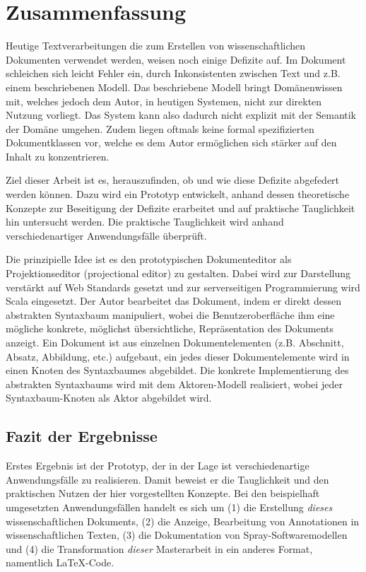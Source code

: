  
\chapter{Zusammenfassung}\label{}
 
Heutige Textverarbeitungen die zum Erstellen von wissenschaftlichen Dokumenten verwendet werden, weisen noch einige Defizite auf. Im Dokument schleichen sich leicht Fehler ein, durch Inkonsistenten zwischen Text und z.B. einem beschriebenen Modell. Das beschriebene Modell bringt Domänenwissen mit, welches jedoch dem Autor, in heutigen Systemen, nicht zur direkten Nutzung vorliegt. Das System kann also dadurch nicht explizit mit der Semantik der Domäne umgehen. Zudem liegen oftmals keine formal spezifizierten Dokumentklassen vor, welche es dem Autor ermöglichen sich stärker auf den Inhalt zu konzentrieren.

 
Ziel dieser Arbeit ist es, herauszufinden, ob und wie diese Defizite abgefedert werden können. Dazu wird ein Prototyp entwickelt, anhand dessen theoretische Konzepte zur Beseitigung der Defizite erarbeitet und auf praktische Tauglichkeit hin untersucht werden. Die praktische Tauglichkeit wird anhand verschiedenartiger Anwendungsfälle überprüft.

 
Die prinzipielle Idee ist es den prototypischen Dokumenteditor als Projektionseditor (projectional editor) zu gestalten. Dabei wird zur Darstellung verstärkt auf Web Standards gesetzt und zur serverseitigen Programmierung wird Scala eingesetzt. Der Autor bearbeitet das Dokument, indem er direkt dessen abstrakten Syntaxbaum manipuliert, wobei die Benutzeroberfläche ihm eine mögliche konkrete, möglichst übersichtliche, Repräsentation des Dokuments anzeigt. Ein Dokument ist aus einzelnen Dokumentelementen (z.B. Abschnitt, Absatz, Abbildung, etc.) aufgebaut, ein jedes dieser Dokumentelemente wird in einen Knoten des Syntaxbaumes abgebildet. Die konkrete Implementierung des abstrakten Syntaxbaums wird mit dem Aktoren-Modell realisiert, wobei jeder Syntaxbaum-Knoten als Aktor abgebildet wird.

 
\section{Fazit der Ergebnisse}\label{}
 
Erstes Ergebnis ist der Prototyp, der in der Lage ist verschiedenartige Anwendungsfälle zu realisieren. Damit beweist er die Tauglichkeit und den praktischen Nutzen der hier vorgestellten Konzepte. Bei den beispielhaft umgesetzten Anwendungsfällen handelt es sich um (1) die Erstellung \emph{dieses} wissenschaftlichen Dokuments, (2) die Anzeige, Bearbeitung von Annotationen in wissenschaftlichen Texten, (3) die Dokumentation von Spray-Softwaremodellen und (4) die Transformation \emph{dieser} Masterarbeit in ein anderes Format, namentlich LaTeX-Code.

